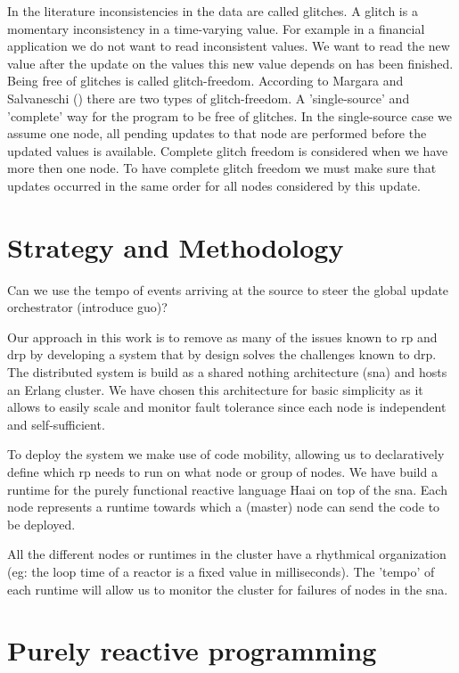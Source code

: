 \documentclass[a4paper]{book}
\begin{document}
In the literature inconsistencies in the data are called glitches. A glitch is a momentary inconsistency in a time-varying value. For example in a financial application we do not want to read inconsistent values. We want to read the new value after the update on the values this new value depends on has been finished. Being free of glitches is called glitch-freedom. According to Margara and Salvaneschi (\cite{DBLP:journals/tse/MargaraS18}) there are two types of glitch-freedom. A 'single-source' and 'complete' way for the program to be free of glitches. In the single-source case we assume one node, all pending updates to that node are performed before the updated values is available. Complete glitch freedom is considered when we have more then one node. To have complete glitch freedom we must make sure that updates occurred in the same order for all nodes considered by this update. 

\chapter{Strategy and Methodology}

Can we use the tempo of events arriving at the source to steer the global update orchestrator (introduce guo)?

Our approach in this work is to remove as many of the issues known to rp and drp by developing a system that by design solves the challenges known to drp. The distributed system is build as a shared nothing architecture (sna) and hosts an Erlang cluster. We have chosen this architecture for basic simplicity as it allows to easily scale and monitor fault tolerance since each node is independent and self-sufficient.

To deploy the system we make use of code mobility, allowing us to declaratively define which rp needs to run on what node or group of nodes. We have build a runtime for the purely functional reactive language Haai on top of the sna. Each node represents a runtime towards which a (master) node can send the code to be deployed.

All the different nodes or runtimes in the cluster have a rhythmical organization (eg: the loop time of a reactor is a fixed value in milliseconds). The 'tempo' of each runtime will allow us to monitor the cluster for failures of nodes in the sna.  

\chapter{Purely reactive programming} \label{sec:prp}
\end{document}
